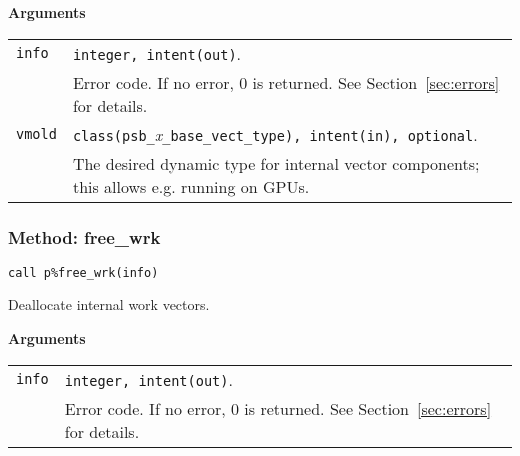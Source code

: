 {\baselineskip\noindent\large\bfseries Arguments} \smallskip

\begin{tabular}{p{1.2cm}p{12cm}}
\verb|info|   & \verb|integer, intent(out)|.\\
              & Error code. If no error, 0 is returned. See Section~\ref{sec:errors} for details.\\
  \verb|vmold| & \verb|class(psb_|\emph{x}\verb|_base_vect_type), intent(in), optional|. \\
  & The desired dynamic type for internal vector
  components; this allows e.g. running on GPUs. \\
\end{tabular}



\subsubsection{Method: free\_wrk}
  
\begin{center}
\verb|call p%free_wrk(info)|\\
\end{center}

\noindent
Deallocate internal work vectors. 

{\baselineskip\noindent\large\bfseries Arguments} \smallskip

\begin{tabular}{p{1.2cm}p{12cm}}
\verb|info|   & \verb|integer, intent(out)|.\\
              & Error code. If no error, 0 is returned. See Section~\ref{sec:errors} for details.\\
\end{tabular}






